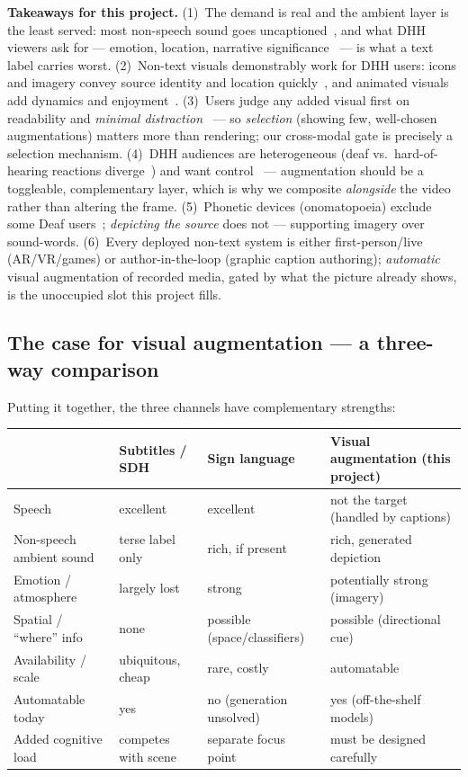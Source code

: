 \documentclass[11pt,a4paper]{article}
\begin{document}
\medskip\noindent\textbf{Takeaways for this project.} (1)~The demand is real and the ambient layer is
the least served: most non-speech sound goes uncaptioned~\cite{unspoken}, and what DHH viewers ask
for --- emotion, location, narrative significance~\cite{choices} --- is what a text label carries
worst. (2)~Non-text visuals demonstrably work for DHH users: icons and imagery convey source identity
and location quickly~\cite{soundvizvr,hmdsound,mirzaeivr}, and animated visuals add dynamics and
enjoyment~\cite{soundwords,emotivecaptions}. (3)~Users judge any added visual first on readability
and \emph{minimal distraction}~\cite{captionroyale} --- so \emph{selection} (showing few,
well-chosen augmentations) matters more than rendering; our cross-modal gate is precisely a selection
mechanism. (4)~DHH audiences are heterogeneous (deaf vs.\ hard-of-hearing reactions
diverge~\cite{emotivecaptions}) and want control~\cite{choices,jainprefs} --- augmentation should be
a toggleable, complementary layer, which is why we composite \emph{alongside} the video rather than
altering the frame. (5)~Phonetic devices (onomatopoeia) exclude some Deaf users~\cite{captune};
\emph{depicting the source} does not --- supporting imagery over sound-words. (6)~Every deployed
non-text system is either first-person/live (AR/VR/games) or author-in-the-loop (graphic caption
authoring); \emph{automatic} visual augmentation of recorded media, gated by what the picture already
shows, is the unoccupied slot this project fills.

\subsection{The case for visual augmentation --- a three-way comparison}
Putting it together, the three channels have complementary strengths:

\begin{center}
\begin{longtable}{@{}p{3.2cm}p{3.5cm}p{3.5cm}p{3.5cm}@{}}
\toprule
& \textbf{Subtitles / SDH} & \textbf{Sign language} & \textbf{Visual augmentation (this project)} \\
\midrule
\endhead
Speech & excellent & excellent & not the target (handled by captions) \\
Non-speech ambient sound & terse label only & rich, if present & rich, generated depiction \\
Emotion / atmosphere & largely lost & strong & potentially strong (imagery) \\
Spatial / ``where'' info & none & possible (space/classifiers) & possible (directional cue) \\
Availability / scale & ubiquitous, cheap & rare, costly & automatable \\
Automatable today & yes & no (generation unsolved) & yes (off-the-shelf models) \\
Added cognitive load & competes with scene & separate focus point & must be designed carefully \\
\bottomrule
\end{longtable}
\end{center}
\end{document}
